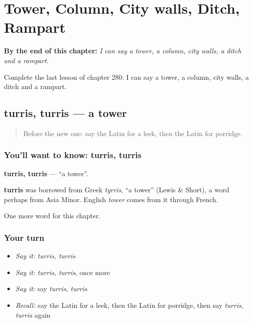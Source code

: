 
\chapter{Tower, Column, City walls, Ditch, Rampart}
\label{ch:la-tower-column-city-walls-ditch-rampart}

\begin{chapteropening}
\textbf{By the end of this chapter:} \emph{I can say a tower, a column, city walls, a ditch and a rampart.}

Complete the last lesson of chapter 280: I can say a tower, a column, city walls, a ditch and a rampart.
\end{chapteropening}

\section[turris, turris]{turris, turris — a tower}

\label{lesson:LA-C280-turris}



\begin{quote}
Before the new one: say the Latin for a leek, then the Latin for porridge.
\end{quote}

\subsection*{You'll want to know: turris, turris}
\textbf{turris, turris} — \textquotedblleft{}a tower\textquotedblright{}.

\begin{cousinweb}
\textbf{turris} was borrowed from Greek \emph{tyrris}, \textquotedblleft{}a tower\textquotedblright{} (Lewis \& Short), a word perhaps from Asia Minor. English \emph{tower} comes from it through French.
\end{cousinweb}

\begin{grammarlens}[title={What you've built}]
One more word for this chapter.
\end{grammarlens}

\subsection*{Your turn}
\begin{itemize}
\raggedright
  \item \emph{Say it:} \emph{turris, turris}
  \item \emph{Say it:} \emph{turris, turris}, once more
  \item \emph{Say it:} say \emph{turris, turris}
  \item \emph{Recall:} say the Latin for a leek, then the Latin for porridge, then say \emph{turris, turris} again
\end{itemize}

